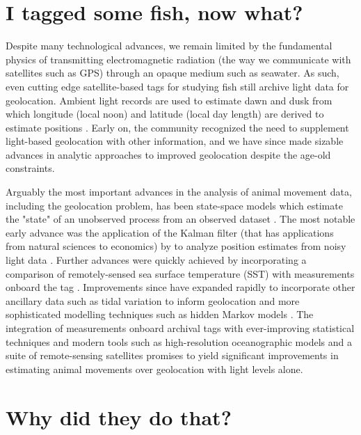 \section{I tagged some fish, now what?}\label{sec:geo}
Despite many technological advances, we remain limited by the fundamental physics of transmitting electromagnetic radiation (the way we communicate with satellites such as GPS) through an opaque medium such as seawater. As such, even cutting edge satellite-based tags for studying fish still archive light data for geolocation. Ambient light records are used to estimate dawn and dusk from which longitude (local noon) and latitude (local day length) are derived to estimate positions \citep{Hill1994, Hill2001}. Early on, the community recognized the need to supplement light-based geolocation with other information, and we have since made sizable advances in analytic approaches to improved geolocation despite the age-old constraints. 

Arguably the most important advances in the analysis of animal movement data, including the geolocation problem, has been state-space models which estimate the "state" of an unobserved process from an observed dataset \citep{Jonsen2013}. The most notable early advance was the application of the Kalman filter (that has applications from natural sciences to economics) by \cite{Sibert2001} to analyze position estimates from noisy light data \citep{Hill2001}. Further advances were quickly achieved by incorporating a comparison of remotely-sensed sea surface temperature (SST) with \is measurements onboard the tag \citep{Teo2004, Nielsen2006}. Improvements since have expanded rapidly to incorporate other ancillary data such as tidal variation \citep{Metcalfe1997} to inform geolocation and more sophisticated modelling techniques such as hidden Markov models \citep{Pedersen2008}. The integration of \is measurements onboard archival tags with ever-improving statistical techniques and modern tools such as high-resolution oceanographic models and a suite of remote-sensing satellites promises to yield significant improvements in estimating animal movements over geolocation with light levels alone.

\section{Why did they do that?}


